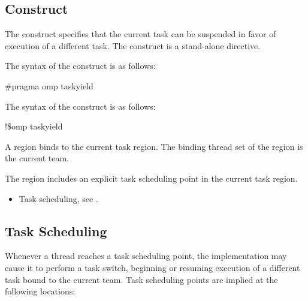 %
%
\subsection{ Construct}
\label{subsec:taskyield Construct}
\summary
The  construct specifies that the current task can be suspended in favor of 
execution of a different task. The  construct is a stand-alone directive.

\syntax
\ccppspecificstart
The syntax of the  construct is as follows:

\begin{boxedcode}
\#pragma omp taskyield 
\end{boxedcode}
\ccppspecificend

\fortranspecificstart
The syntax of the  construct is as follows:

\begin{boxedcode}
!\$omp taskyield
\end{boxedcode}
\fortranspecificend

\binding
A  region binds to the current task region. The binding thread set of the 
 region is the current team.

\descr
The  region includes an explicit task scheduling point in the current task 
region.

\crossreferences
\begin{itemize}
\item Task scheduling, see 
. 
\end{itemize}













\subsection{Task Scheduling}
\label{subsec:Task Scheduling}
Whenever a thread reaches a task scheduling point, the implementation may cause it to 
perform a task switch, beginning or resuming execution of a different task bound to the 
current team. Task scheduling points are implied at the following locations:

